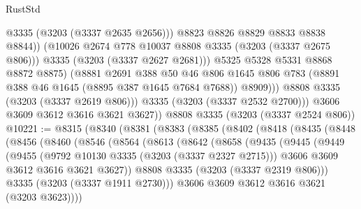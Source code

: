 \begin{lexlean}{RustStd}
\begin{coremodule}
                          @3335
                          (@3203 (@3337 @2635 @2656)))
                        @8823
                        @8826
                        @8829
                        @8833
                        @8838
                        @8844))
                    (@10026 @2674 @778 @10037 @8808 @3335 (@3203 (@3337 @2675 @806)))
                    @3335
                    (@3203 (@3337 @2627 @2681)))
                  @5325
                  @5328
                  @5331
                  @8868
                  @8872
                  @8875)
                (@8881
                  @2691
                  @388
                  @50
                  @46
                  @806
                  @1645
                  @806
                  @783
                  (@8891 @388 @46 @1645 (@8895 @387 @1645 @7684 @7688))
                  @8909)))
            @8808
            @3335
            (@3203 (@3337 @2619 @806)))
          @3335
          (@3203 (@3337 @2532 @2700)))
        @3606
        @3609
        @3612
        @3616
        @3621
        @3627))
    @8808
    @3335
    (@3203 (@3337 @2524 @806))
@10221 := @8315
    (@8340
      (@8381
        (@8383
          (@8385
            (@8402
              (@8418
                (@8435
                  (@8448
                    (@8456
                      (@8460
                        (@8546
                          (@8564
                            (@8613
                              (@8642
                                (@8658
                                  (@9435
                                    (@9445
                                      (@9449
                                        (@9455
                                          (@9792 @10130 @3335 (@3203 (@3337 @2327 @2715)))
                                          @3606
                                          @3609
                                          @3612
                                          @3616
                                          @3621
                                          @3627))
                                      @8808
                                      @3335
                                      (@3203 (@3337 @2319 @806)))
                                    @3335
                                    (@3203 (@3337 @1911 @2730)))
                                  @3606
                                  @3609
                                  @3612
                                  @3616
                                  @3621
                                  (@3203 @3623))))

\end{coremodule}
\end{lexlean}
